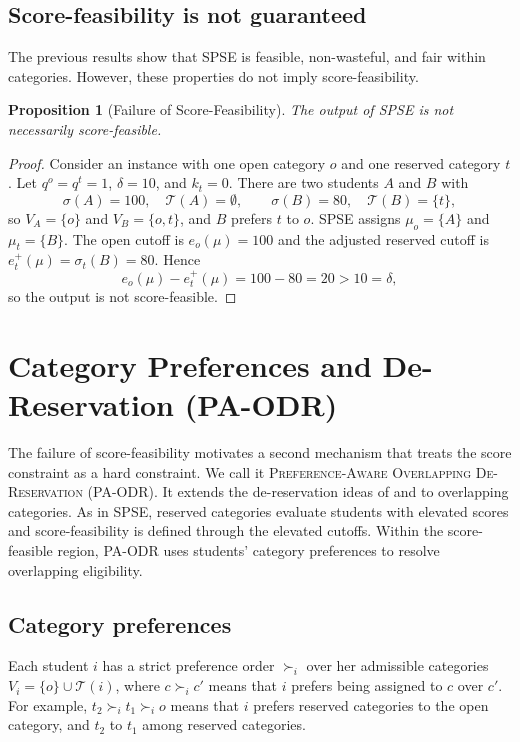 \documentclass[10pt]{article}
\newtheorem{proposition}{Proposition}
\newcommand{\T}{\mathcal{T}}
\newcommand{\1}{\mathbf{1}}
\begin{document}
\subsection{Score-feasibility is not guaranteed}

The previous results show that SPSE is feasible, non-wasteful, and fair within categories. However, these properties do not imply score-feasibility.

\begin{proposition}[Failure of Score-Feasibility]
\label{prop:score-feasibility-not-guaranteed}
The output of SPSE is not necessarily score-feasible.
\end{proposition}

\begin{proof}
Consider an instance with one open category $o$ and one reserved category $t$. Let $q^o=q^t=1$, $\delta=10$, and $k_t=0$. There are two students $A$ and $B$ with
\[
\sigma(A)=100,\quad \T(A)=\emptyset,
\qquad
\sigma(B)=80,\quad \T(B)=\{t\},
\]
so $V_A=\{o\}$ and $V_B=\{o,t\}$, and $B$ prefers $t$ to $o$. SPSE assigns $\mu_o=\{A\}$ and $\mu_t=\{B\}$. The open cutoff is $e_o(\mu)=100$ and the adjusted reserved cutoff is $e_t^+(\mu)=\sigma_t(B)=80$. Hence
\[
e_o(\mu)-e_t^+(\mu)=100-80=20>10=\delta,
\]
so the output is not score-feasible.
\end{proof}

\section{Category Preferences and De-Reservation (PA-ODR)}

The failure of score-feasibility motivates a second mechanism that treats the score constraint as a hard constraint. We call it \textsc{Preference-Aware Overlapping De-Reservation} (PA-ODR). It extends the de-reservation ideas of \citet{AyTu20a} and \citet{AyTu23a} to overlapping categories. As in SPSE, reserved categories evaluate students with elevated scores and score-feasibility is defined through the elevated cutoffs. Within the score-feasible region, PA-ODR uses students' category preferences to resolve overlapping eligibility.

\subsection{Category preferences}

Each student $i$ has a strict preference order $\succ_i$ over her admissible categories $V_i=\{o\}\cup\T(i)$, where $c\succ_i c'$ means that $i$ prefers being assigned to $c$ over $c'$. For example, $t_2\succ_i t_1\succ_i o$ means that $i$ prefers reserved categories to the open category, and $t_2$ to $t_1$ among reserved categories.
\end{document}
